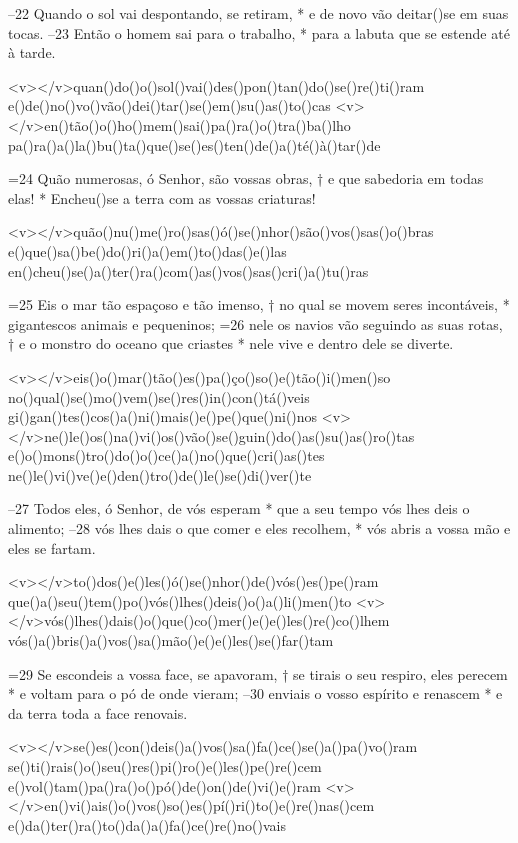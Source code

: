 –22 Quando o sol vai despontando, se retiram, *
e de novo vão deitar()se em suas tocas. 
–23 Então o homem sai para o trabalho, *
para a labuta que se estende até à tarde.

<v></v>quan()do()o()sol()vai()des()pon()tan()do()se()re()ti()ram
e()de()no()vo()vão()dei()tar()se()em()su()as()to()cas
<v></v>en()tão()o()ho()mem()sai()pa()ra()o()tra()ba()lho
pa()ra()a()la()bu()ta()que()se()es()ten()de()a()té()à()tar()de

=24 Quão numerosas, ó Senhor, são vossas obras, †
e que sabedoria em todas elas! *
Encheu()se a terra com as vossas criaturas!

<v></v>quão()nu()me()ro()sas()ó()se()nhor()são()vos()sas()o()bras
e()que()sa()be()do()ri()a()em()to()das()e()las
en()cheu()se()a()ter()ra()com()as()vos()sas()cri()a()tu()ras

=25 Eis o mar tão espaçoso e tão imenso, †
no qual se movem seres incontáveis, *
gigantescos animais e pequeninos; 
=26 nele os navios vão seguindo as suas rotas, †
e o monstro do oceano que criastes *
nele vive e dentro dele se diverte.

<v></v>eis()o()mar()tão()es()pa()ço()so()e()tão()i()men()so
no()qual()se()mo()vem()se()res()in()con()tá()veis
gi()gan()tes()cos()a()ni()mais()e()pe()que()ni()nos
<v></v>ne()le()os()na()vi()os()vão()se()guin()do()as()su()as()ro()tas
e()o()mons()tro()do()o()ce()a()no()que()cri()as()tes
ne()le()vi()ve()e()den()tro()de()le()se()di()ver()te

–27 Todos eles, ó Senhor, de vós esperam *
que a seu tempo vós lhes deis o alimento; 
–28 vós lhes dais o que comer e eles recolhem, *
vós abris a vossa mão e eles se fartam.

<v></v>to()dos()e()les()ó()se()nhor()de()vós()es()pe()ram
que()a()seu()tem()po()vós()lhes()deis()o()a()li()men()to
<v></v>vós()lhes()dais()o()que()co()mer()e()e()les()re()co()lhem
vós()a()bris()a()vos()sa()mão()e()e()les()se()far()tam

=29 Se escondeis a vossa face, se apavoram, †
se tirais o seu respiro, eles perecem *
e voltam para o pó de onde vieram; 
–30 enviais o vosso espírito e renascem *
e da terra toda a face renovais.

<v></v>se()es()con()deis()a()vos()sa()fa()ce()se()a()pa()vo()ram
se()ti()rais()o()seu()res()pi()ro()e()les()pe()re()cem
e()vol()tam()pa()ra()o()pó()de()on()de()vi()e()ram
<v></v>en()vi()ais()o()vos()so()es()pí()ri()to()e()re()nas()cem
e()da()ter()ra()to()da()a()fa()ce()re()no()vais

